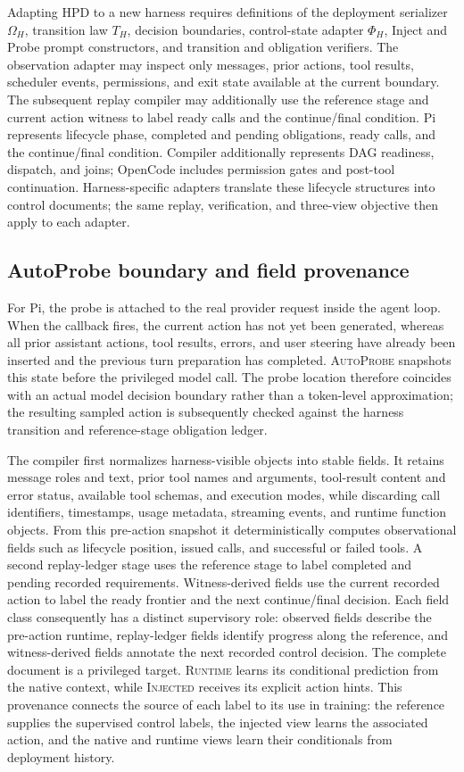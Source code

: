 \documentclass{article}
\newcommand{\hpd}{\textsc{HPD}}
\newcommand{\injected}{\textsc{Injected}}
\newcommand{\runtime}{\textsc{Runtime}}
\newcommand{\autoprobe}{\textsc{AutoProbe}}
\begin{document}
Adapting \hpd{} to a new harness requires definitions of the deployment
serializer $\Omega_H$, transition law $T_H$, decision boundaries, control-state
adapter $\Phi_H$, Inject and Probe prompt constructors, and transition and
obligation verifiers. The observation adapter may inspect only messages, prior
actions, tool results, scheduler events, permissions, and exit state available
at the current boundary. The subsequent replay compiler may additionally use
the reference stage and current action witness to label ready calls and the
continue/final condition. Pi represents lifecycle phase, completed and pending
obligations, ready calls, and the continue/final condition. Compiler additionally represents
DAG readiness, dispatch, and joins; OpenCode includes permission gates and
post-tool continuation. Harness-specific adapters translate these lifecycle
structures into control documents; the same replay, verification, and
three-view objective then apply to each adapter.

\subsection{AutoProbe boundary and field provenance}

For Pi, the probe is attached to the real provider request inside the agent
loop. When the callback fires, the current action has not yet been generated,
whereas all prior assistant actions, tool results, errors, and user steering have
already been inserted and the previous turn preparation has completed.
\autoprobe{} snapshots this state before the privileged model call. The probe
location therefore coincides with an actual model decision boundary rather than
a token-level approximation; the resulting sampled action is subsequently
checked against the harness transition and reference-stage obligation ledger.

The compiler first normalizes harness-visible objects into stable fields. It
retains message roles and text, prior tool names and arguments, tool-result
content and error status, available tool schemas, and execution modes, while
discarding call identifiers, timestamps, usage metadata, streaming events, and
runtime function objects. From this pre-action snapshot it deterministically
computes observational fields such as lifecycle position, issued calls, and
successful or failed tools. A second replay-ledger stage uses the reference
stage to label completed and pending recorded requirements. Witness-derived
fields use the current recorded action to label the ready frontier and the next
continue/final decision. Each field class consequently has a distinct
supervisory role: observed fields describe the pre-action runtime,
replay-ledger fields identify progress along the reference, and witness-derived
fields annotate the next recorded control decision. The complete document
is a privileged target. \runtime{} learns its conditional prediction from
the native context, while \injected{} receives its explicit action hints.
This provenance connects the source of each label to its use in training:
the reference supplies the supervised control labels, the injected view learns
the associated action, and the native and runtime views learn their
conditionals from deployment history.
\end{document}
